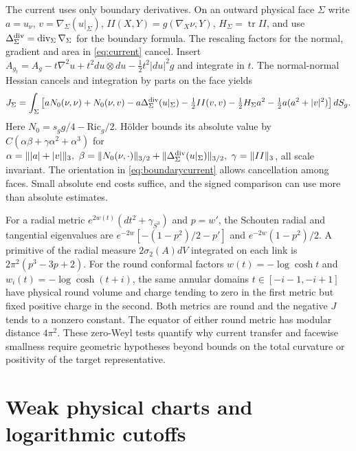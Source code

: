 \documentclass[11pt]{article}
\theoremstyle{remark}
\newcommand{\Ric}{\mathrm{Ric}}
\newcommand{\Tr}{\operatorname{tr}}
\begin{document}
The current uses only boundary derivatives. On an outward physical face \(\Sigma\) write \(a=u_\nu\), \(v=\nabla_\Sigma(u|_\Sigma)\), \(II(X,Y)=g(\nabla_X\nu,Y)\), \(H_\Sigma=\Tr II\), and use \(\Delta_\Sigma^{\rm div}=\operatorname{div}_\Sigma\nabla_\Sigma\) for the boundary formula. The rescaling factors for the normal, gradient and area in \eqref{eq:current} cancel. Insert \(A_{g_t}=A_g-t\nabla^2u+t^2du\otimes du-\tfrac12t^2|du|^2g\) and integrate in \(t\). The normal-normal Hessian cancels and integration by parts on the face yields
\begin{equation}
 J_\Sigma=\int_\Sigma\left[
 aN_0(\nu,\nu)+N_0(\nu,v)-a\Delta_\Sigma^{\rm div}(u|_\Sigma)
 -\tfrac12 II(v,v)-\tfrac12 H_\Sigma a^2-\tfrac12 a(a^2+|v|^2)
 \right]dS_g .
 \label{eq:boundarycurrent}
\end{equation}
Here \(N_0=s_gg/4-\Ric_g/2\). Hölder bounds its absolute value by \(C(\alpha\beta+\gamma\alpha^2+\alpha^3)\) for \(\alpha=\||a|+|v|\|_3,\ \beta=\|N_0(\nu,\cdot)\|_{3/2}+\|\Delta_\Sigma^{\rm div}(u|_\Sigma)\|_{3/2},\ \gamma=\|II\|_3\), all scale invariant. The orientation in \eqref{eq:boundarycurrent} allows cancellation among faces. Small absolute end costs suffice, and the signed comparison can use more than absolute estimates.

For a radial metric \(e^{2w(t)}(dt^2+\gamma_{S^3})\) and \(p=w'\), the Schouten radial and tangential eigenvalues are \(e^{-2w}[-(1-p^2)/2-p']\) and \(e^{-2w}(1-p^2)/2\). A primitive of the radial measure \(2\sigma_2(A)dV\) integrated on each link is \(2\pi^2(p^3-3p+2)\). For the round conformal factors \(w(t)=-\log\cosh t\) and \(w_i(t)=-\log\cosh(t+i)\), the same annular domains \(t\in[-i-1,-i+1]\) have physical round volume and charge tending to zero in the first metric but fixed positive charge in the second. Both metrics are round and the negative \(J\) tends to a nonzero constant. The equator of either round metric has modular distance \(4\pi^2\). These zero-Weyl tests quantify why current transfer and facewise smallness require geometric hypotheses beyond bounds on the total curvature or positivity of the target representative.

\section{Weak physical charts and logarithmic cutoffs}\label{sec:charts}
\end{document}
